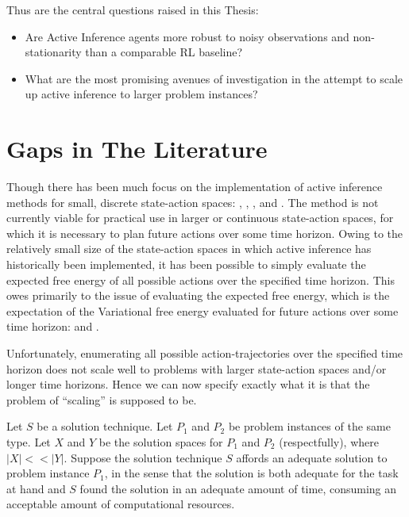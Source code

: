 \documentclass[onecolumn]{IEEEtran}
\begin{document}
Thus are the central questions raised in this Thesis:

\begin{itemize}
\item Are Active Inference agents more robust to noisy observations and non-stationarity than a comparable RL baseline?
\item What are the most promising avenues of investigation in the attempt to scale up active inference to larger problem instances? 
\end{itemize} 

\section{Gaps in The Literature}
Though there has been much focus on the implementation of active inference methods for small, discrete state-action spaces: \textcite{Applications-of-FEP-Machine-Learning-Neuroscience}, \textcite{AIF-Discrete-Action-Spaces-Synthesis}, \textcite{Step-by-Step-Tutorial-AIF-Empirical-Data}, \textcite{Relationship-Dynamic-Programming-AIF} and \textcite{AIF-Epistemic-Value}. The method is not currently viable for practical use in larger or continuous state-action spaces, for which it is necessary to plan future actions over some time horizon. Owing to the relatively small size of the state-action spaces in which active inference has historically been implemented, it has been possible to simply evaluate the expected free energy of all possible actions over the specified time horizon. This owes primarily to the issue of evaluating the expected free energy, which is the expectation of the Variational free energy evaluated for future actions over some time horizon: \textcite{Message-Passing-Perspective-Planning-Under-AIF} and \textcite{Bayesian-Policy-Selection-Using-AIF}. 

Unfortunately, enumerating all possible action-trajectories over the specified time horizon does not scale well to problems with larger state-action spaces
and/or longer time horizons. Hence we can now specify exactly what it is that the problem of ``scaling'' is supposed to be. 

Let $S$ be a solution technique. Let $P_1$ and $P_2$ be problem instances of the same type. Let $X$ and $Y$ be the solution spaces for $P_1$ and $P_2$ (respectfully), where $|X| << |Y|$. Suppose the solution technique $S$ affords an adequate solution to problem instance $P_1$, in the sense that the solution is both adequate for the task at hand and $S$ found the solution in an adequate amount of time, consuming an acceptable amount of computational resources. 
\end{document}
